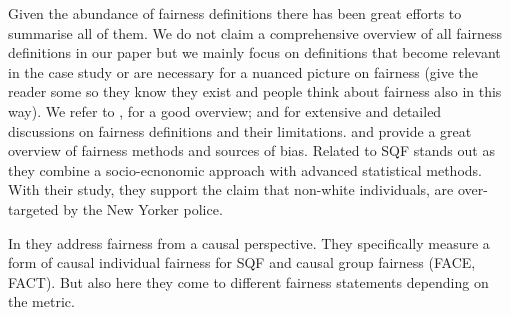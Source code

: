 Given the abundance of fairness definitions there has been great efforts to summarise all of them. We do not claim a comprehensive overview of all fairness definitions in our paper but we mainly focus on definitions that become relevant in the case study or are necessary for a nuanced picture on fairness (give the reader some so they know they exist and people think about fairness also in this way).
We refer to \cite{verma2018}, \cite{castelnovo2022} for a good overview; \cite{corbett-davies} and \cite{barocas} for extensive and detailed discussions on fairness definitions and their limitations.
\cite{mehrabi2022} and \cite{caton2024} provide a great overview of fairness methods and sources of bias.
Related to SQF \cite{goel2016} stands out as they combine a socio-ecnonomic approach with advanced statistical methods. With their study, they support the claim that non-white individuals, are over-targeted by the New Yorker police. 

\cite{Badr2022DTFANSP}

\cite{RambachanBBOEFW}

\cite{kallus2018}


In \cite{Khademi2019FADMELC} they address fairness from a causal perspective. They specifically measure a form of causal individual fairness for SQF and causal group fairness (FACE, FACT). But also here they come to different fairness statements depending on the metric.

